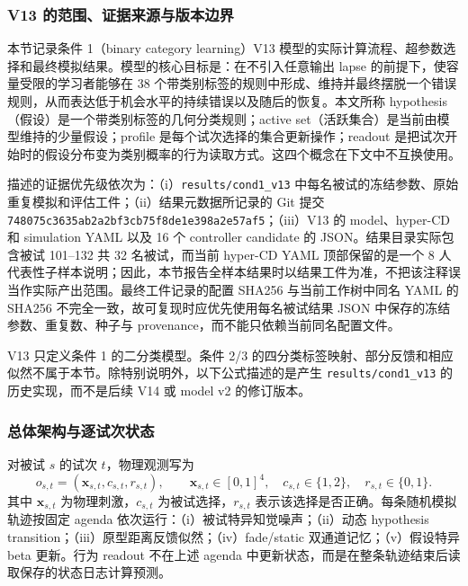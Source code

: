 
\subsubsection{V13 的范围、证据来源与版本边界}

本节记录条件 1（binary category learning）V13 模型的实际计算流程、超参数选择和最终模拟结果。模型的核心目标是：在不引入任意输出 lapse 的前提下，使容量受限的学习者能够在 38 个带类别标签的规则中形成、维持并最终摆脱一个错误规则，从而表达低于机会水平的持续错误以及随后的恢复。本文所称 hypothesis（假设）是一个带类别标签的几何分类规则；active set（活跃集合）是当前由模型维持的少量假设；profile 是每个试次选择的集合更新操作；readout 是把试次开始时的假设分布变为类别概率的行为读取方式。这四个概念在下文中不互换使用。

描述的证据优先级依次为：（i）\texttt{results/cond1\_v13} 中每名被试的冻结参数、原始重复模拟和评估工件；（ii）结果元数据所记录的 Git 提交 \texttt{748075c3635ab2a2bf3cb75f8de1e398a2e57af5}；（iii）V13 的 model、hyper-CD 和 simulation YAML 以及 16 个 controller candidate 的 JSON。结果目录实际包含被试 101--132 共 32 名被试，而当前 hyper-CD YAML 顶部保留的是一个 8 人代表性子样本说明；因此，本节报告全样本结果时以结果工件为准，不把该注释误当作实际产出范围。最终工件记录的配置 SHA256 与当前工作树中同名 YAML 的 SHA256 不完全一致，故可复现时应优先使用每名被试结果 JSON 中保存的冻结参数、重复数、种子与 provenance，而不能只依赖当前同名配置文件。

V13 只定义条件 1 的二分类模型。条件 2/3 的四分类标签映射、部分反馈和相应似然不属于本节。除特别说明外，以下公式描述的是产生 \texttt{results/cond1\_v13} 的历史实现，而不是后续 V14 或 model v2 的修订版本。


\subsubsection{总体架构与逐试次状态}

对被试 $s$ 的试次 $t$，物理观测写为
\begin{equation}
    o_{s,t}=(\mathbf x_{s,t},c_{s,t},r_{s,t}),
    \qquad
    \mathbf x_{s,t}\in[0,1]^4,\quad
    c_{s,t}\in\{1,2\},\quad
    r_{s,t}\in\{0,1\}.
    \label{eq:modelv13-observation}
\end{equation}
其中 $\mathbf x_{s,t}$ 为物理刺激，$c_{s,t}$ 为被试选择，$r_{s,t}$ 表示该选择是否正确。每条随机模拟轨迹按固定 agenda 依次运行：（i）被试特异知觉噪声；（ii）动态 hypothesis transition；（iii）原型距离反馈似然；（iv）fade/static 双通道记忆；（v）假设特异 beta 更新。行为 readout 不在上述 agenda 中更新状态，而是在整条轨迹结束后读取保存的状态日志计算预测。

